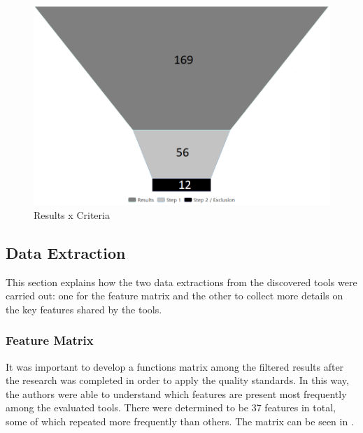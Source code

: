 

\begin{figure}[!htb]
  \caption{Results x Criteria}\label{fig:gl-results-criteria}
  \begin{center}
    \includegraphics[width=12cm]{img/4-results.png}
  \end{center}
\end{figure}

\subsection{Data Extraction}\label{sec:gl-data-extraction}

This section explains how the two data extractions from the discovered tools were carried out: one for the feature matrix and the other to collect more details on the key features shared by the tools.

\subsubsection{Feature Matrix}\label{sec:gl-feature-matrix}

It was important to develop a functions matrix among the filtered results after the research was completed in order to apply the quality standards. In this way, the authors were able to understand which features are present most frequently among the evaluated tools. There were determined to be 37 features in total, some of which repeated more frequently than others. The matrix can be seen in .

